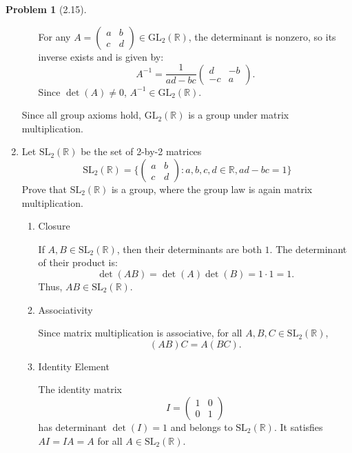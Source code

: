 \documentclass[12pt]{article}
\theoremstyle{definition}
\newtheorem{problem}{Problem}
\begin{document}
\begin{problem}[2.15]
\begin{enumerate}[label=(\alph*)]
\begin{solution}
\begin{enumerate}[label=(\roman*)]
                For any $A = \begin{pmatrix} a & b \\ c & d \end{pmatrix} \in \text{GL}_2(\mathbb{R})$, the determinant is nonzero, so its inverse exists and is given by:
                \[
                A^{-1} = \frac{1}{ad - bc} \begin{pmatrix} d & -b \\ -c & a \end{pmatrix}.
                \]
                Since $\det(A) \neq 0$, $A^{-1} \in \text{GL}_2(\mathbb{R})$.
                \end{enumerate}
            Since all group axioms hold, $\text{GL}_2(\mathbb{R})$ is a group under matrix multiplication.
        \end{solution}
        \item Let $\text{SL}_2(\mathbb{R})$ be the set of 2-by-2 matrices
            \begin{equation*}
                \text{SL}_2(\mathbb{R}) = 
                \biggl\{ \begin{pmatrix} a & b \\ c & d \end{pmatrix} : a, b, c, d \in \mathbb{R}, ad - bc = 1 \biggr\}
            \end{equation*}
        Prove that $\text{SL}_2(\mathbb{R})$ is a group, where the group law is again matrix multiplication.
        \begin{solution}
            \begin{enumerate}[label=(\roman*)]
                \item Closure
                
                If $A, B \in \text{SL}_2(\mathbb{R})$, then their determinants are both $1$. The determinant of their product is:
                \[
                \det(AB) = \det(A) \det(B) = 1 \cdot 1 = 1.
                \]
                Thus, $AB \in \text{SL}_2(\mathbb{R})$.

                \item Associativity
                
                Since matrix multiplication is associative, for all $A, B, C \in \text{SL}_2(\mathbb{R})$,
                \[
                (AB)C = A(BC).
                \]

                \item Identity Element
                
                The identity matrix 
                \[
                I = \begin{pmatrix}1 & 0 \\ 0 & 1\end{pmatrix}
                \]
                has determinant $\det(I) = 1$ and belongs to $\text{SL}_2(\mathbb{R})$. It satisfies $AI = IA = A$ for all $A \in \text{SL}_2(\mathbb{R})$.


\end{enumerate}
\end{solution}
\end{enumerate}
\end{problem}
\end{document}
